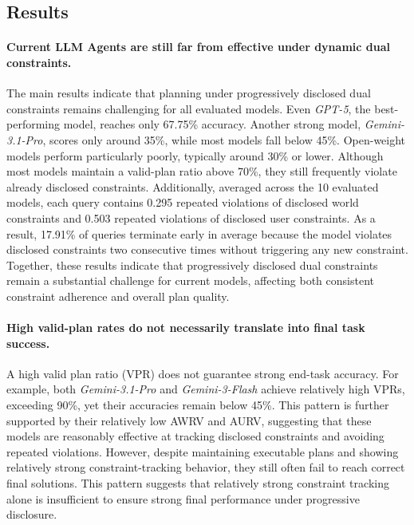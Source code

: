 \documentclass{llmxive}
\begin{document}
\subsection{Results}

\paragraph{Current LLM Agents are still far from effective under dynamic dual constraints.}
The main results indicate that planning under progressively disclosed dual constraints remains challenging for all evaluated models. 
Even \textit{GPT-5}, the best-performing model, reaches only 67.75\% accuracy. 
Another strong model, \textit{Gemini-3.1-Pro}, scores only around 35\%, while most models fall below 45\%. 
Open-weight models perform particularly poorly, typically around 30\% or lower. 
Although most models maintain a valid-plan ratio above 70\%, they still frequently violate already disclosed constraints. 
Additionally, averaged across the 10 evaluated models, each query contains 0.295 repeated violations of disclosed world constraints and 0.503 repeated violations of disclosed user constraints.
As a result, 17.91\% of queries terminate early in average because the model violates disclosed constraints two consecutive times without triggering any new constraint. 
Together, these results indicate that progressively disclosed dual constraints remain a substantial challenge for current models, affecting both consistent constraint adherence and overall plan quality.

\paragraph{High valid-plan rates do not necessarily translate into final task success.}
A high valid plan ratio (VPR) does not guarantee strong end-task accuracy. 
For example, both \textit{Gemini-3.1-Pro} and \textit{Gemini-3-Flash} achieve relatively high VPRs, exceeding 90\%, yet their accuracies remain below 45\%. 
This pattern is further supported by their relatively low AWRV and AURV, suggesting that these models are reasonably effective at tracking disclosed constraints and avoiding repeated violations. 
However, despite maintaining executable plans and showing relatively strong constraint-tracking behavior, they still often fail to reach correct final solutions. 
This pattern suggests that relatively strong constraint tracking alone is insufficient to ensure strong final performance under progressive disclosure.
\end{document}
